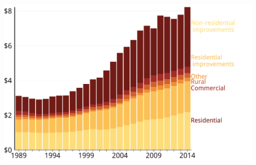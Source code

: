 \documentclass[tikz]{standalone}\usepackage[]{graphicx}\usepackage[]{color}
\newenvironment{knitrout}{}{} %
\begin{document}
\begin{knitrout}
\color{fgcolor}
\includegraphics[width=11.000in,height=7.00in]{./Property-taxes/atlas/figure/PROP-Figure2-1} 

\end{knitrout}
\end{document}
